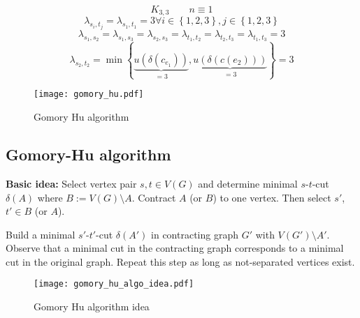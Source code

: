 \documentclass{article}
\newcommand{\set}[1]{\left\{#1\right\}}
\begin{document}
\[
  K_{3,3} \qquad n \equiv 1
\] \[
  \lambda_{s_i,t_j} = \lambda_{s_1, t_1} = 3 \forall i \in \set{1, 2, 3}, j \in \set{1, 2, 3}
\] \[
  \lambda_{s_1,s_2} = \lambda_{s_1,s_3} = \lambda_{s_2,s_3} = \lambda_{t_1,t_2}
    = \lambda_{t_2,t_3} = \lambda_{t_1,t_3} = 3
\] \[
  \lambda_{s_2, t_2} = \min\set{
    \underbrace{u(\delta(c_{e_1}))}_{=3},
    \underbrace{u(\delta(c(e_2)))}_{=3}
  } = 3
\]

\begin{figure}[h]
 \begin{center}
  \texttt{[image: gomory\_hu.pdf]}
  \caption{Gomory Hu algorithm}
 \end{center}
\end{figure}

\subsection{Gomory-Hu algorithm}
\textbf{Basic idea:}
  Select vertex pair $s, t \in V(G)$ and determine minimal $s$-$t$-cut $\delta(A)$ where $B := V(G) \setminus A$. Contract $A$ (or $B$) to one vertex. Then select $s'$, $t' \in B$ (or $A$).

  Build a minimal $s'$-$t'$-cut $\delta(A')$ in contracting graph $G'$ with $V(G') \setminus A'$. Observe that a minimal cut in the contracting graph corresponds to a minimal cut in the original graph. Repeat this step as long as not-separated vertices exist.

\begin{figure}[h]
 \begin{center}
  \texttt{[image: gomory\_hu\_algo\_idea.pdf]}
  \caption{Gomory Hu algorithm idea}
 \end{center}
\end{figure}
\end{document}
